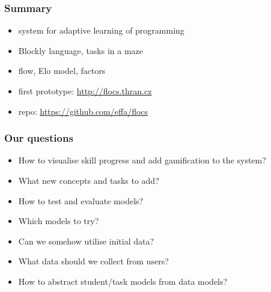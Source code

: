 \documentclass[xcolor=dvipsnames, 14pt]{beamer}
\begin{document}
\begin{frame}
\frametitle{Summary}
\begin{itemize}
\item system for adaptive learning of programming
\item Blockly language, tasks in a maze
\item flow, Elo model, factors
\item first prototype: \url{http://flocs.thran.cz}
\item repo: \url{https://github.com/effa/flocs}
\end{itemize}
\end{frame}

\begin{frame}
\frametitle{Our questions}
\begin{itemize}
\item How to visualise skill progress and add gamification to the system?
\item What new concepts and tasks to add?
\item How to test and evaluate models?
\item Which models to try?
\item Can we somehow utilise initial data?
\item What data should we collect from users?
\item How to abstract student/task models from data models?
\end{itemize}
\end{frame}
\end{document}
